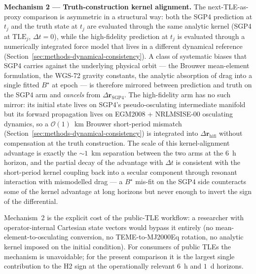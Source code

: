 \documentclass[10pt, letterpaper]{article}
\begin{document}
\textbf{Mechanism 2 --- Truth-construction kernel alignment.} The
next-TLE-as-proxy comparison is asymmetric in a structural way:
both the SGP4 prediction at $t_{j}$ and the truth state at $t_{j}$
are evaluated through the same analytic kernel
(SGP4 at $\mathrm{TLE}_{j}$, $\Delta t = 0$), while the
high-fidelity prediction at $t_{j}$ is evaluated through a
numerically integrated force model that lives in a different
dynamical reference (Section~\ref{sec:methods-dynamical-consistency}).
A class of systematic biases that SGP4 carries against the
underlying physical orbit --- the Brouwer mean-element formulation,
the WGS-72 gravity constants, the analytic absorption of drag into
a single fitted $B^{\!\star}$ at epoch --- is therefore mirrored
between prediction and truth on the SGP4 arm and \emph{cancels}
from $\Delta\mathbf{r}_{\mathrm{SGP4}}$. The high-fidelity arm has
no such mirror: its initial state lives on SGP4's
pseudo-osculating intermediate manifold but its forward propagation
lives on EGM2008 + NRLMSISE-00 osculating dynamics, so a
$\mathcal{O}(1)$~km Brouwer short-period mismatch
(Section~\ref{sec:methods-dynamical-consistency}) is integrated
into $\Delta\mathbf{r}_{\mathrm{hifi}}$ without compensation at the
truth construction. The scale of this kernel-alignment advantage
is exactly the $\sim 1$~km separation between the two arms at the
$6$~h horizon, and the partial decay of the advantage with
$\Delta t$ is consistent with the short-period kernel coupling
back into a secular component through resonant interaction with
mismodelled drag --- a $B^{\!\star}$ mis-fit on the SGP4 side
counteracts some of the kernel advantage at long horizons but
never enough to invert the sign of the differential.

Mechanism~2 is the explicit cost of the public-TLE workflow: a
researcher with operator-internal Cartesian state vectors would
bypass it entirely (no mean-element-to-osculating conversion, no
TEME-to-MJ2000Eq rotation, no analytic kernel imposed on the
initial condition). For consumers of public TLEs the mechanism is
unavoidable; for the present comparison it is the largest single
contribution to the H2 sign at the operationally relevant $6$~h
and $1$~d horizons.
\end{document}
